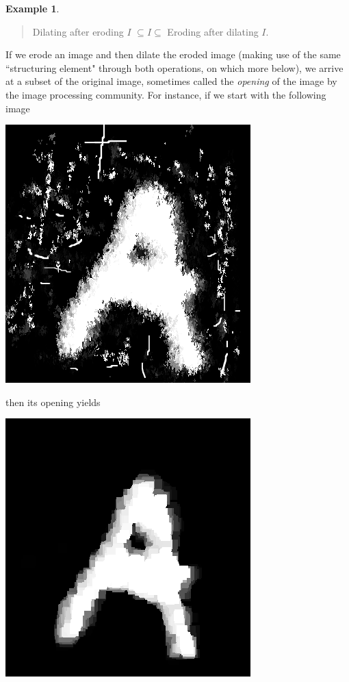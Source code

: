 \documentclass[a4paper]{book}
\theoremstyle{definition}
\newtheorem{example}{Example}[section]
\theoremstyle{definition}
\theoremstyle{definition}
\theoremstyle{theorem}
\theoremstyle{definition}
\begin{document}
\begin{example}
	\begin{quote}
	\hspace*{2em} Dilating after eroding $I$ $\subseteq  I \subseteq $ Eroding after dilating $I$.	
	\end{quote}
	If we erode an image and then dilate the eroded image (making use of the same ``structuring element" through both operations, on which more below), we arrive at a subset of the original image, sometimes called the \textit{opening}  of the image by the image processing community. For instance, if we start with the following image
	\begin{center}
		\includegraphics*[scale=0.25]{LetterAWithMess.png}
	\end{center}
	then its opening yields 
	\begin{center}
		\includegraphics*[scale=0.25]{LetterAAfterOpening.png}

\end{center}
\end{example}
\end{document}
